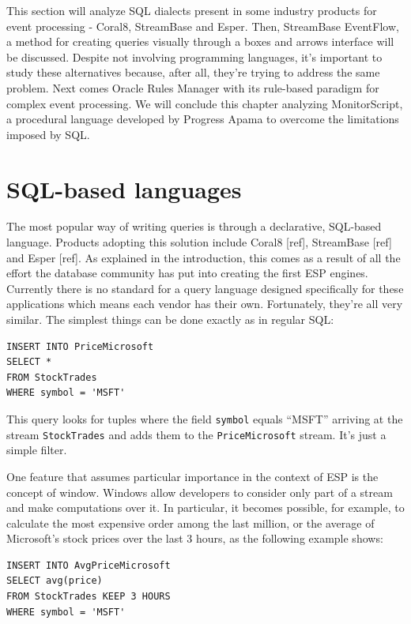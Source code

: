 \documentclass{report}
\begin{document}
This section will analyze SQL dialects present in some industry
products for event processing - Coral8, StreamBase and Esper. Then,
StreamBase EventFlow, a method for creating queries visually through a
boxes and arrows interface will be discussed. Despite not involving
programming languages, it's important to study these alternatives
because, after all, they're trying to address the same problem. Next
comes Oracle Rules Manager with its rule-based paradigm for complex
event processing. We will conclude this chapter analyzing
MonitorScript, a procedural language developed by Progress Apama to
overcome the limitations imposed by SQL.

\section{SQL-based languages}
\label{sec:sql}

The most popular way of writing queries is through a declarative,
SQL-based language. Products adopting this solution include Coral8
[ref], StreamBase [ref] and Esper [ref]. As explained in the
introduction, this comes as a result of all the effort the database
community has put into creating the first ESP engines. Currently there
is no standard for a query language designed specifically for these
applications which means each vendor has their own. Fortunately,
they're all very similar. The simplest things can be done exactly as
in regular SQL:

\begin{verbatim}
INSERT INTO PriceMicrosoft
SELECT *
FROM StockTrades
WHERE symbol = 'MSFT'
\end{verbatim}

This query looks for tuples where the field \verb=symbol= equals
``MSFT'' arriving at the stream \verb=StockTrades= and adds them to
the \verb=PriceMicrosoft= stream. It's just a simple filter.

One feature that assumes particular importance in the context of ESP
is the concept of window. Windows allow developers to consider only
part of a stream and make computations over it. In particular, it
becomes possible, for example, to calculate the most expensive order
among the last million, or the average of Microsoft's stock prices
over the last 3 hours, as the following example shows:

\begin{verbatim}
INSERT INTO AvgPriceMicrosoft
SELECT avg(price)
FROM StockTrades KEEP 3 HOURS
WHERE symbol = 'MSFT'
\end{verbatim}
\end{document}
